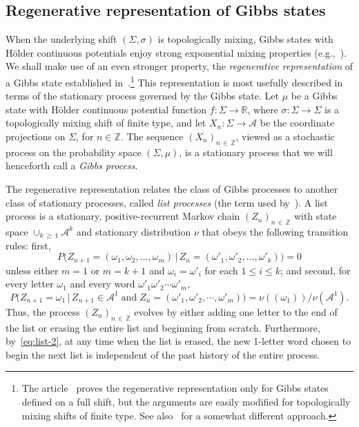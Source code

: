 \documentclass[AHL, Unicode, longabstracts, published]{cedram}
\newcommand{\zz}[1]{\mathbb #1}
\begin{document}
\subsection{Regenerative representation of Gibbs states}\label{ssec:regeneration}

When the underlying shift $(\Sigma,\sigma)$ is topologically mixing, Gibbs states with H\"older continuous potentials enjoy strong exponential mixing properties (e.g.,~\cite[the ``exponential cluster property''~1.26 in Chapter~1]{bowen:book}). We shall make use of an even stronger property, the \emph{regenerative representation} of a Gibbs state established in~\cite{lalley:regeneration}.\footnote{The article~\cite{lalley:regeneration} proves the regenerative representation only for Gibbs states defined on a full shift, but the arguments are easily modified for topologically mixing shifts of finite type. See also~\cite{comets-et-al} for a somewhat different approach.} This representation is most usefully described in terms of the stationary process governed by the Gibbs state. Let $\mu$ be a Gibbs state with H\"older continuous potential function $f:\Sigma \rightarrow \mathbb{R}$, where $\sigma :\Sigma \rightarrow \Sigma$ is a topologically mixing shift of finite type, and let $X_{n}:\Sigma \rightarrow \mathcal{A}$ be the coordinate projections on $\Sigma$, for $n\in \zz{Z}$. The sequence $(X_{n})_{n\,\in\,\zz{Z}}$, viewed as a stochastic process on the probability space $(\Sigma,\mu)$, is a stationary process that we will henceforth call a \emph{Gibbs process}.

The regenerative representation relates the class of Gibbs processes to another class of stationary processes, called \emph{list processes} (the term used by~\cite{lalley:regeneration}). A list process is a stationary, positive-recurrent Markov chain $(Z_{n})_{n\,\in\,\zz{Z}}$ with state space $\cup_{k\,\geq\,1}\mathcal{A}^{k}$ and stationary distribution $\nu$ that obeys the following transition rules: first,
\begin{equation}\label{eq:list-1}
P \big(Z_{n+1}= (\omega_{1},\omega_{2},\dotsc,\omega_{m})\,\big|\, Z_{n}= (\omega '_{1},\omega '_{2},\dotsc, \omega '_{k})\big)=0
\end{equation}
unless either $m=1$ or $m=k+1$ and $\omega_{i}=\omega '_{i}$ for each $1\leq i\leq k$; and second, for every letter $\omega_{1}$ and every word $\omega '_{1}\omega '_{2}\dotsb \omega '_{m}$,
\begin{equation}\label{eq:list-2}
P \big(Z_{n+1}=\omega_{1}\,\big|\, Z_{n+1}\in \mathcal{A}^{1} \;\text{and}\; Z_{n}= (\omega '_{1},\omega '_{2},\dotsb,\omega '_{m})\big) =\nu ((\omega_{1}))/\nu (\mathcal{A}^{1}).
\end{equation}
Thus, the process $(Z_{n})_{n\,\in\,\zz{Z}}$ evolves by either adding one letter to the end of the list or erasing the entire list and beginning from scratch. Furthermore, by~\eqref{eq:list-2}, at any time when the list is erased, the new 1-letter word chosen to begin the next list is independent of the past history of the entire process.
\end{document}
